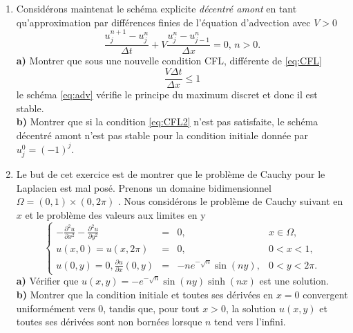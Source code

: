 \documentclass[12pt,a4paper]{article}
\begin{document}
\begin{enumerate}
Il s'agit ici d'un probl\`eme aux limites o\`u on a impos\'e des conditions de
Dirichlet. \\
{\bf a)} Si on note par $U^n = (u_j^n)_{1\le j\le J}$ le vecteur des valeurs
inconnues \`a l'instant $n$, v\'erifier qu'on peut calculer de mani\`ere unique $U^n$
en fonction de $U^{n-1}$, en r\'esolvant un syst\`eme lin\'eaire de
la forme
$$
AU^n=U^{n-1}
$$
dont on pr\'ecisera la matrice. (Il faudra ensuite montrer que la
matrice est inversible ce qui entra\^inera l'unicit\'e).\\
{\bf b)} Montrer que pour tous les temps $t_n \ge 0$ le principe du
maximum discret \eqref{eq:max} est v\'erifi\'e sans aucune condition
sur le pas de temps $\Delta t$ et le pas d'espace $\Delta x$. On dit que le
sch\'ema est {\it inconditionnellement stable}. 
\item Consid\'erons maintenat le sch\'ema explicite {\it d\'ecentr\'e
    amont} en tant qu'approximation par diff\'erences finies de
  l'\'equation d'advection avec $V>0$
\begin{equation}\label{eq:adv}
\displaystyle\frac{u_j^{n+1}-u_j^{n}}{\Delta
  t}+V\frac{u_j^n-u_{j-1}^n}{\Delta x} = 0,\, n >0.
\end{equation}
{\bf a)} Montrer que sous une nouvelle condition CFL, diff\'erente de
\eqref{eq:CFL}
\begin{equation}\label{eq:CFL2}
\frac{V\Delta t}{\Delta x} \le 1
\end{equation}
le sch\'ema \eqref{eq:adv} v\'erifie le principe du maximum discret et
donc il est stable.\\
{\bf b)} Montrer que si la condition \eqref{eq:CFL2} n'est pas
satisfaite, le sch\'ema d\'ecentr\'e amont n'est pas stable pour la
condition initiale donn\'ee par $u^0_j=(-1)^j$.
\item Le but de cet exercice est de montrer que le probl\`eme de Cauchy pour le Laplacien est mal pos\'e. Prenons un domaine bidimensionnel $\Omega = (0,1)\times (0,2\pi)$ . Nous consid\'erons le probl\`eme de Cauchy suivant en $x$ et le probl\`eme des valeurs aux limites en y
$$
\left\{\begin{array}{rcll}
-\displaystyle\frac{\partial^2u}{\partial x^2}  -\frac{\partial^2u}{\partial y^2} & = & 0, & x\in \Omega, \\[2ex]
u(x,0) = u(x,2\pi) &=& 0, & 0< x<1,\\[2ex]
\displaystyle u(0,y) = 0, \frac{\partial u}{\partial x}(0,y) &=&  -ne^{-\sqrt{n}}\sin (ny), & 0<y<2\pi.
\end{array}\right.
$$
{\bf a)} V\'erifier que $u (x, y) = -e^{-\sqrt{n}}\sin (ny) \sinh (nx)$ est une solution. \\
{\bf b)} Montrer que la condition initiale et toutes ses d\'eriv\'ees en $x=0$ convergent uniform\'ement vers 0, tandis que, pour tout $x>0$, la solution $u(x,y)$ et toutes ses d\'eriv\'ees sont non born\'ees lorsque $n$ tend vers l'infini.
\end{enumerate}
\end{document}
